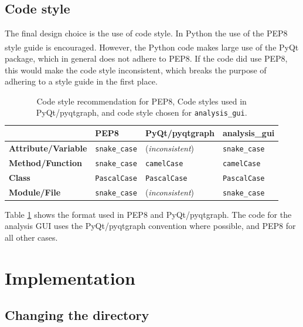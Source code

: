 \documentclass[12pt]{article}
\begin{document}
\subsection{Code style}\label{ssec:code_style}

The final design choice is the use of code style. In Python the use of the PEP8 style guide is encouraged.\textsuperscript{\cite{pep8}} However, the Python code makes large use of the PyQt package, which in general does not adhere to PEP8. If the code did use PEP8, this would make the code style inconsistent, which breaks the purpose of adhering to a style guide in the first place.

\begin{table}[h]
    \centering
    \begin{tabular}{@{}llll@{}}
    \toprule
    & \textbf{PEP8} & \textbf{PyQt/pyqtgraph} & \textbf{analysis\_gui} \\ \midrule
    \textbf{Attribute/Variable} & \texttt{snake\_case} & (\textit{inconsistent}) & \texttt{snake\_case} \\
    \textbf{Method/Function} & \texttt{snake\_case} & \texttt{camelCase} & \texttt{camelCase}\footnotemark \\
    \textbf{Class} & \texttt{PascalCase} & \texttt{PascalCase} & \texttt{PascalCase} \\
    \textbf{Module/File} & \texttt{snake\_case} & (\textit{inconsistent}) & \texttt{snake\_case} \\ \bottomrule
    \end{tabular}
    \caption{Code style recommendation for PEP8, Code styles used in PyQt/pyqtgraph, and code style chosen for \texttt{analysis\_gui}.\label{tab:code_style}}
\end{table}

Table \ref{tab:code_style} shows the format used in PEP8 and PyQt/pyqtgraph. The code for the analysis GUI uses the PyQt/pyqtgraph convention where possible, and PEP8 for all other cases.

\section{Implementation}\label{sec:implementation}

\subsection{Changing the directory}\label{ssec:dir_edit}
\end{document}
